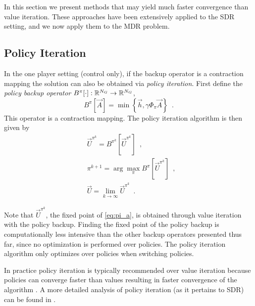 In this section we present methods that may yield much faster convergence than value iteration. These approaches have been extensively applied to the SDR setting, and we now apply them to the MDR problem. 

\subsection{Policy Iteration}

In the one player setting (control only), if the backup operator is a contraction mapping the solution can also be obtained via \emph{policy iteration}. First define the \emph{policy backup operator} $B^{\pi}[\cdot]: \mathbb{R}^{N_G} \rightarrow \mathbb{R}^{N_G}$, 
%
\begin{equation} \label{eq:backup_policy}
B^{\pi}[\vec{A}] = \min\left\{ \vec{h}, \gamma \Phi_{\pi} \vec{A} \right \} \enspace.
\end{equation}%
\noindent This operator is a contraction mapping. The policy iteration algorithm is then given by
%
\begin{subequations}\label{eq:pi}
\begin{align}
&\vec{U}^{\pi^k} = B^{\pi^k}[\vec{U}^{\pi^k}] \label{eq:pi_a} \enspace,\\
&\pi^{k+1} = \arg\underset{\pi}{\max}B^{\pi}[\vec{U}^{\pi^k}] \enspace,\\ 
&\vec{U} = \lim_{k\rightarrow \infty} \vec{U}^{\pi^k}\enspace.
\end{align}
\end{subequations}

Note that ${\vec{U}^{\pi^k}}$, the fixed point of \eqref{eq:pi_a}, is obtained through value iteration with the policy backup. Finding the fixed point of the policy backup is computationally less intensive than the other backup operators presented thus far, since no optimization is performed over policies. The policy iteration algorithm only optimizes over policies when switching policies.  

In practice policy iteration is typically recommended over value iteration because policies can converge faster than values resulting in faster convergence of the algorithm \cite{Russell2003}. A more detailed analysis of policy iteration (as it pertains to SDR) can be found in \cite{Bokanowski2009,Howard1964, Puterman1979}. 

